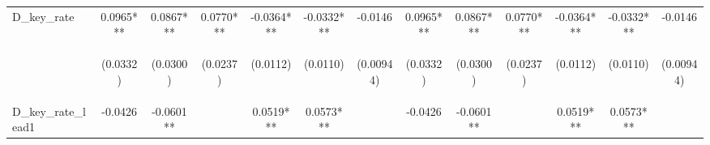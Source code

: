 \documentclass[]{article}
\begin{document}
\begin{center}
\begin{tabular}{lcccccccccccc}
D\_key\_rate & 0.0965*** & 0.0867*** & 0.0770*** & -0.0364*** & -0.0332*** & -0.0146 & 0.0965*** & 0.0867*** & 0.0770*** & -0.0364*** & -0.0332*** & -0.0146 \\
\vspace{4pt} & \begin{footnotesize}(0.0332)\end{footnotesize} & \begin{footnotesize}(0.0300)\end{footnotesize} & \begin{footnotesize}(0.0237)\end{footnotesize} & \begin{footnotesize}(0.0112)\end{footnotesize} & \begin{footnotesize}(0.0110)\end{footnotesize} & \begin{footnotesize}(0.00944)\end{footnotesize} & \begin{footnotesize}(0.0332)\end{footnotesize} & \begin{footnotesize}(0.0300)\end{footnotesize} & \begin{footnotesize}(0.0237)\end{footnotesize} & \begin{footnotesize}(0.0112)\end{footnotesize} & \begin{footnotesize}(0.0110)\end{footnotesize} & \begin{footnotesize}(0.00944)\end{footnotesize} \\
D\_key\_rate\_lead1 & -0.0426 & -0.0601** &  & 0.0519*** & 0.0573*** &  & -0.0426 & -0.0601** &  & 0.0519*** & 0.0573*** &  \\

\end{tabular}
\end{center}
\end{document}

